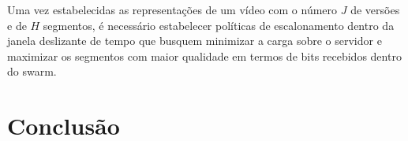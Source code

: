 \documentclass[
	12pt,				%
	oneside,			%
	a4paper,			%
	english,			%
	brazil				%
	]{abntex2ppgsi}
\begin{document}
Uma vez estabelecidas as representações de um vídeo com o número $J$ de versões e de $H$ segmentos, é necessário estabelecer políticas de escalonamento dentro da janela deslizante de tempo que busquem minimizar a carga sobre o servidor e maximizar os segmentos com maior qualidade em termos de bits recebidos dentro do swarm.

\chapter{Conclusão}




\postextual

%



%

\end{document}
